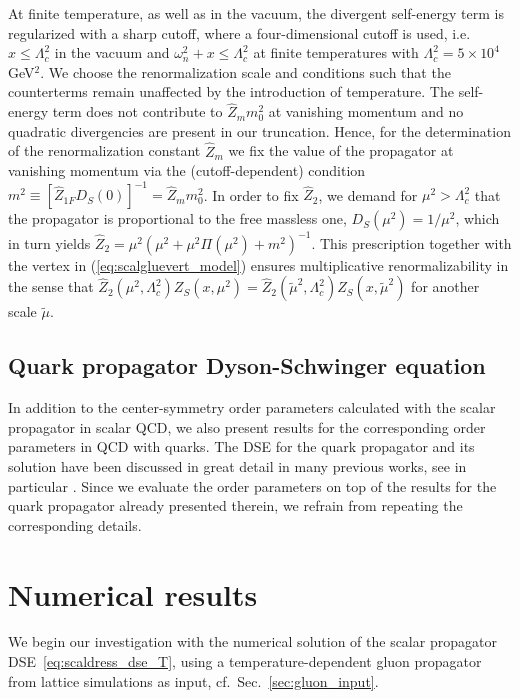 \documentclass[final,twocolumn,merge,sort&compress]{elsarticle}
\begin{document}
At finite temperature, as well as in the vacuum, the divergent
self-energy term is regularized with a sharp cutoff, where
a four-dimensional cutoff is used, i.e.
$x \leq \Lambda_c^2$ in the vacuum and $\omega_n^2 + x \leq \Lambda_c^2$
at finite temperatures with
$\Lambda_c^2 = 5\times 10^4$ GeV$^2$. We choose the renormalization
scale and conditions such that the counterterms remain unaffected by
the introduction of temperature. The self-energy term does not
contribute to $\hat{Z}_m m_0^2$ at vanishing momentum and no quadratic
divergencies are present in our truncation. Hence, for the
determination of the renormalization constant $\hat{Z}_m$ we fix the
value of the propagator at vanishing momentum via the
(cutoff-dependent) condition
$m^2 \equiv [ \hat{Z}_{1F} D_S(0) ]^{-1} = \hat{Z}_m m_0^2$.  In order
to fix $\hat{Z}_2$, we demand for $\mu^2>\Lambda_c^2$ that the
propagator is proportional to the free massless one,
$D_S(\mu^2) = 1/\mu^2$, which in turn yields
$\hat{Z}_2 = \mu^2 \left(\mu^2 + \mu^2\Pi(\mu^2) + m^2\right)^{-1}$.
This prescription together with the vertex in
(\ref{eq:scalgluevert_model}) ensures multiplicative renormalizability
in the sense that
$\hat{Z}_2(\mu^2,\Lambda_c^2)Z_S\left(x,\mu^2\right) =
\hat{Z}_2(\tilde\mu^2,\Lambda_c^2)Z_S\left(x,\tilde\mu^2\right)$ for
another scale $\tilde{\mu}$.


\subsection{Quark propagator Dyson-Schwinger equation}
\label{sec:DSE_quarkprop}

In addition to the center-symmetry order parameters calculated with
the scalar propagator in scalar QCD, we also present results for the
corresponding order parameters in QCD with quarks. The DSE for the
quark propagator and its solution have been discussed in great detail
in many previous works, see in particular \cite{Fischer:2010fx}. Since
we evaluate the order parameters on top of the results for the quark
propagator already presented therein, we refrain from repeating the
corresponding details.

\section{Numerical results}
\label{sec:centersym_nr}

We begin our investigation with the numerical solution of the scalar
propagator DSE~\eqref{eq:scaldress_dse_T}, using a
temperature-dependent gluon propagator from lattice simulations as
input, cf.\ Sec.~\ref{sec:gluon_input}.
\end{document}
